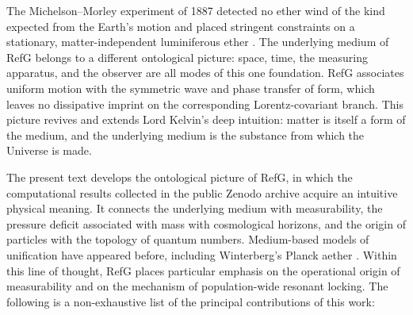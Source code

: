\documentclass[11pt,a4paper]{article}
\begin{document}
The Michelson--Morley experiment of 1887 detected no ether wind of the kind expected from the Earth's motion and placed stringent constraints on a stationary, matter-independent luminiferous ether \citep{michelson1887}. The underlying medium of RefG belongs to a different ontological picture: space, time, the measuring apparatus, and the observer are all modes of this one foundation. RefG associates uniform motion with the symmetric wave and phase transfer of form, which leaves no dissipative imprint on the corresponding Lorentz-covariant branch. This picture revives and extends Lord Kelvin's deep intuition: matter is itself a form of the medium, and the underlying medium is the substance from which the Universe is made.

The present text develops the ontological picture of RefG, in which the computational results collected in the public Zenodo archive acquire an intuitive physical meaning. It connects the underlying medium with measurability, the pressure deficit associated with mass with cosmological horizons, and the origin of particles with the topology of quantum numbers. Medium-based models of unification have appeared before, including Winterberg's Planck aether \citep{winterberg2002}. Within this line of thought, RefG places particular emphasis on the operational origin of measurability and on the mechanism of population-wide resonant locking. The following is a non-exhaustive list of the principal contributions of this work:
\end{document}
